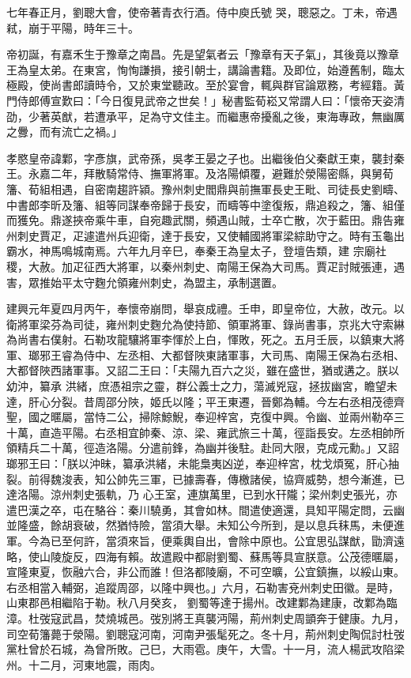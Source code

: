 \begin{pinyinscope}
 七年春正月，劉聰大會，使帝著青衣行酒。侍中庾氏號
 哭，聰惡之。丁未，帝遇弒，崩于平陽，時年三十。



 帝初誕，有嘉禾生于豫章之南昌。先是望氣者云「豫章有天子氣」，其後竟以豫章王為皇太弟。在東宮，恂恂謙損，接引朝士，講論書籍。及即位，始遵舊制，臨太極殿，使尚書郎讀時令，又於東堂聽政。至於宴會，輒與群官論眾務，考經籍。黃門侍郎傅宣歎曰：「今日復見武帝之世矣！」秘書監荀崧又常謂人曰：「懷帝天姿清劭，少著英猷，若遭承平，足為守文佳主。而繼惠帝擾亂之後，東海專政，無幽厲之釁，而有流亡之禍。」



 孝愍皇帝諱鄴，字彥旗，武帝孫，吳孝王晏之子也。出繼後伯父秦獻王柬，襲封秦王。永嘉二年，拜散騎常侍、撫軍將軍。及洛陽傾覆，避難於滎陽密縣，與舅荀籓、荀組相遇，自密南趨許潁。豫州刺史閻鼎與前撫軍長史王毗、司徒長史劉疇、中書郎李昕及籓、組等同謀奉帝歸于長安，而疇等中塗復叛，鼎追殺之，籓、組僅而獲免。鼎遂挾帝乘牛車，自宛趣武關，頻遇山賊，士卒亡散，次于藍田。鼎告雍州刺史賈疋，疋遽遣州兵迎衛，達于長安，又使輔國將軍梁綜助守之。時有玉龜出霸水，神馬鳴城南焉。六年九月辛巳，奉秦王為皇太子，登壇告類，建
 宗廟社稷，大赦。加疋征西大將軍，以秦州刺史、南陽王保為大司馬。賈疋討賊張連，遇害，眾推始平太守麴允領雍州刺史，為盟主，承制選置。



 建興元年夏四月丙午，奉懷帝崩問，舉哀成禮。壬申，即皇帝位，大赦，改元。以衛將軍梁芬為司徒，雍州刺史麴允為使持節、領軍將軍、錄尚書事，京兆大守索綝為尚書右僕射。石勒攻龍驤將軍李惲於上白，惲敗，死之。五月壬辰，以鎮東大將軍、瑯邪王睿為侍中、左丞相、大都督陜東諸軍事，大司馬、南陽王保為右丞相、大都督陜西諸軍事。又詔二王曰：「夫陽九百六之災，雖在盛世，猶或遘之。朕以幼沖，纂承
 洪緒，庶憑祖宗之靈，群公義士之力，蕩滅兇寇，拯拔幽宮，瞻望未達，肝心分裂。昔周邵分陜，姬氏以隆；平王東遷，晉鄭為輔。今左右丞相茂德齊聖，國之暱屬，當恃二公，掃除鯨鯢，奉迎梓宮，克復中興。令幽、並兩州勒卒三十萬，直造平陽。右丞相宜帥秦、涼、梁、雍武旅三十萬，徑詣長安。左丞相帥所領精兵二十萬，徑造洛陽。分遣前鋒，為幽并後駐。赴同大限，克成元勳。」又詔瑯邪王曰：「朕以沖昧，纂承洪緒，未能梟夷凶逆，奉迎梓宮，枕戈煩冤，肝心抽裂。前得魏浚表，知公帥先三軍，已據壽春，傳檄諸侯，協齊威勢，想今漸進，已達洛陽。涼州刺史張軌，乃
 心王室，連旗萬里，已到水幵隴；梁州刺史張光，亦遣巴漢之卒，屯在駱谷：秦川驍勇，其會如林。間遣使適還，具知平陽定問，云幽並隆盛，餘胡衰破，然猶恃險，當須大舉。未知公今所到，是以息兵秣馬，未便進軍。今為已至何許，當須來旨，便乘輿自出，會除中原也。公宜思弘謀猷，勖濟遠略，使山陵旋反，四海有賴。故遣殿中都尉劉蜀、蘇馬等具宣朕意。公茂德暱屬，宣隆東夏，恢融六合，非公而誰！但洛都陵廟，不可空曠，公宜鎮撫，以綏山東。右丞相當入輔弼，追蹤周邵，以隆中興也。」六月，石勒害兗州刺史田徽。是時，山東郡邑相繼陷于勒。秋八月癸亥，
 劉蜀等達于揚州。改建鄴為建康，改鄴為臨漳。杜弢寇武昌，焚燒城邑。弢別將王真襲沔陽，荊州刺史周顗奔于健康。九月，司空荀籓薨于滎陽。劉聰寇河南，河南尹張髦死之。冬十月，荊州刺史陶侃討杜弢黨杜曾於石城，為曾所敗。己巳，大雨雹。庚午，大雪。十一月，流人楊武攻陷梁州。十二月，河東地震，雨肉。




\end{pinyinscope}
